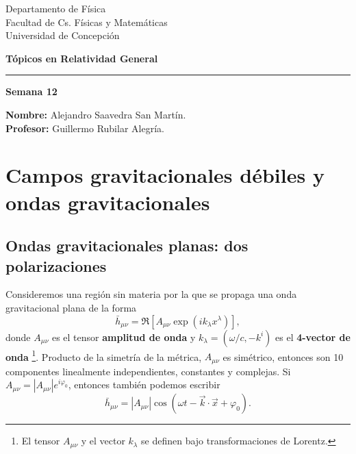 \documentclass[letterpaper,11pt]{article}
\begin{document}
\pagestyle{plain}

\begin{flushleft}\vspace{-2cm}
Departamento de Física \\
Facultad de Cs. Físicas y Matemáticas\\
Universidad de Concepción
\end{flushleft}

\begin{flushright}\vspace{-1.5cm}
\textbf{Tópicos en Relatividad General} 
\end{flushright}



\rule{\linewidth}{0.1mm}

\begin{center}
\textbf{\LARGE Semana 12}
\end{center}

\begin{flushleft}
\textbf{Nombre:} Alejandro Saavedra San Martín. \\
\textbf{Profesor:} Guillermo Rubilar Alegría.
\end{flushleft}

\section{Campos gravitacionales débiles y ondas gravitacionales}

\subsection{Ondas gravitacionales planas: dos polarizaciones}

Consideremos una región sin materia por la que se propaga una onda gravitacional plana de la forma
\begin{equation}
\bar{h}_{\mu\nu} = \Re\left[ A_{\mu\nu} \exp(ik_{\lambda} x^{\lambda})\right], \label{eq:plane-wave-1}
\end{equation}
donde $A_{\mu\nu}$ es el tensor \textbf{amplitud de onda} y $k_{\lambda} = (\omega/c, - k^i)$ es el \textbf{4-vector de onda} \footnote{El tensor $A_{\mu\nu}$ y el vector $k_{\lambda}$ se definen bajo transformaciones de Lorentz.}. Producto de la simetría de la métrica, $A_{\mu\nu}$ es simétrico, entonces son 10 componentes linealmente independientes, constantes y complejas. Si $A_{\mu\nu} = |A_{\mu\nu}| e^{i\varphi_0}$, entonces también podemos escribir
\begin{equation}
\bar{h}_{\mu\nu} = |A_{\mu\nu}| \cos(\omega t - \vec{k} \cdot \vec{x} + \varphi_0). \label{eq:plane-wave-2}
\end{equation}
\end{document}
